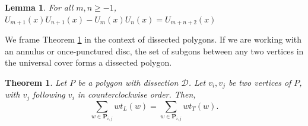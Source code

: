 \documentclass[12pt]{article}
\newtheorem{theorem}{Theorem}
\newtheorem{lemma}{Lemma}
\theoremstyle{remark}
\newcommand*{\pathset}[2]{\mathbf{P}_{#1,#2}}
\newcommand*{\D}{\mathcal{D}}
\begin{document}
\begin{lemma}\label{lem:ChebyshevProduct}
For all $m,n \geq -1$,
$U_{m+1}(x)U_{n+1}(x) - U_m(x)U_n(x) = U_{m+n+2}(x)$
\end{lemma}

We frame Theorem \ref{thm:EqualWeights} in the context of dissected polygons. If we are working with an annulus or once-punctured disc, the set of subgons between any two vertices in the universal cover forms a dissected polygon. 

\begin{theorem}\label{thm:EqualWeights}
Let $P$ be a polygon with dissection $\D$. Let $v_i,v_j$ be two vertices of $P$, with $v_j$ following $v_i$ in counterclockwise order. Then,
\[
\sum_{w \in \pathset{i}{j}} wt_L(w) = \sum_{w \in \pathset{i}{j}} wt_T(w).
\]
\end{theorem}
\end{document}
